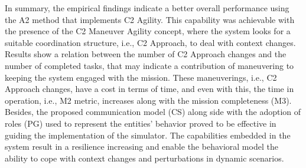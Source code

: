 
In summary, the empirical findings indicate a better overall performance using the A2 method that implements C2 Agility. This capability was achievable with the presence of the C2 Maneuver Agility concept, where the system looks for a suitable coordination structure, i.e., C2 Approach, to deal with context changes. Results show a relation between the number of C2 Approach changes and the number of completed tasks, that may indicate a contribution of maneuvering to keeping the system engaged with the mission. These maneuverings, i.e., C2 Approach changes, have a cost in terms of time, and even with this, the time in operation, i.e., M2 metric, increases along with the mission completeness (M3). Besides, the proposed communication model (CS) along side with the adoption of roles (PG) used to represent the entities' behavior proved to be effective in guiding the implementation of the simulator. The capabilities embedded in the system result in a resilience increasing and enable the behavioral model the ability to cope with context changes and perturbations in dynamic scenarios.


